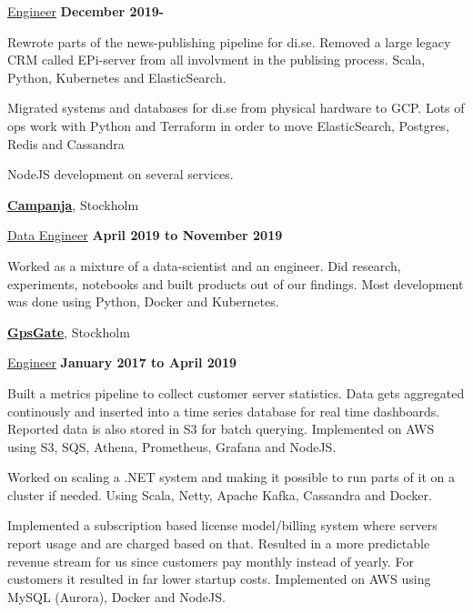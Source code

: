 \documentclass[10pt]{article}
\renewcommand\textit[1]{\underline{#1}}
\newcommand{\halfblankline}{\quad\vspace{-0.5\baselineskip}\pagebreak[3]}
\begin{document}
\begin{outerlist}
\item[] \textit{Engineer}
  \hfill \textbf{December 2019-}
  \begin{innerlist}
  \item
        Rewrote parts of the news-publishing pipeline for di.se. Removed
        a large legacy CRM called EPi-server from all involvment in the publising
        process.
        Scala, Python, Kubernetes and ElasticSearch.
  \item
        Migrated systems and databases for di.se from physical hardware to GCP.
        Lots of ops work with Python and Terraform in order to move ElasticSearch,
        Postgres, Redis and Cassandra
  \item
        NodeJS development on several services.
  \end{innerlist}
\end{outerlist}
\halfblankline

\href{http://campanja.com/}{\textbf{Campanja}},
Stockholm

\begin{outerlist}
\item[] \textit{Data Engineer}
	\hfill \textbf{April 2019 to November 2019}
	\begin{innerlist}
	\item
        Worked as a mixture of a data-scientist and an engineer. Did research,
        experiments, notebooks and built products out of our findings.
        Most development was done using Python, Docker and Kubernetes.
	\end{innerlist}
\end{outerlist}
\halfblankline

\href{http://gpsgate.com/}{\textbf{GpsGate}},
Stockholm

\begin{outerlist}
\item[] \textit{Engineer}
  \hfill \textbf{January 2017 to April 2019}
  \begin{innerlist}
  \item
    Built a metrics pipeline to collect customer server statistics.
    Data gets aggregated continously and inserted into a time series database
    for real time dashboards. Reported data is also stored in S3 for batch
    querying.
    Implemented on AWS using S3, SQS, Athena, Prometheus, Grafana and NodeJS.
  \item
    Worked on scaling a .NET system and making it possible to run parts of it on
    a cluster if needed. Using Scala, Netty, Apache Kafka, Cassandra and Docker.
  \item
    Implemented a subscription based license model/billing system where servers
    report usage and are charged based on that. Resulted in a more predictable
    revenue stream for us since customers pay monthly instead of yearly. For
    customers it resulted in far lower startup costs.
    Implemented on AWS using MySQL (Aurora), Docker and NodeJS.
  \end{innerlist}
\end{outerlist}
\end{document}
